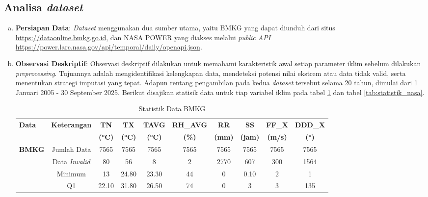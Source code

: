 \subsection{Analisa \textit{dataset}}
    \begin{enumerate}[(a)]
        \item \textbf{Persiapan Data}: \textit{Dataset} menggunakan dua sumber utama, yaitu BMKG yang dapat diunduh dari situs \url{https://dataonline.bmkg.go.id}, dan NASA POWER yang diakses melalui \textit{public API} \url{https://power.larc.nasa.gov/api/temporal/daily/openapi.json}.
        \item \textbf{Observasi Deskriptif}: Observasi deskriptif dilakukan untuk memahami karakteristik awal setiap parameter iklim sebelum dilakukan \textit{preprocessing}. Tujuannya adalah mengidentifikasi kelengkapan data, mendeteksi potensi nilai ekstrem atau data tidak valid, serta menentukan strategi imputasi yang tepat. Adapun rentang pengambilan pada kedua \textit{dataset} tersebut selama 20 tahun, dimulai dari 1 Januari 2005 - 30 September 2025. Berikut disajikan statisik data untuk tiap variabel iklim pada tabel \ref{tab:statistik_bmkg} dan tabel \ref{tab:statistik_nasa}.
        \begin{table}[H] 
            \centering
            \caption{Statistik Data BMKG}
            \label{tab:statistik_bmkg}
            \begin{adjustbox}{max width=\textwidth}
            \small
            \begin{tabular}{|l|c|c|c|c|c|c|c|c|c|}
            \hline
            \textbf{Data} & \textbf{Keterangan} & \textbf{TN} & \textbf{TX} & \textbf{TAVG} & \textbf{RH\_AVG} & \textbf{RR} & \textbf{SS} & \textbf{FF\_X} & \textbf{DDD\_X} \\
            & & \textbf{(°C)} & \textbf{(°C)} & \textbf{(°C)} & \textbf{(\%)} & \textbf{(mm)} & \textbf{(jam)} & \textbf{(m/s)} & \textbf{(°)} \\
            \hline\hline
            \multirow{9}{*}{\textbf{BMKG}} 
            & Jumlah Data & 7565 & 7565 & 7565 & 7565 & 7565 & 7565 & 7565 & 7565 \\
            \cline{2-10}
            & Data \textit{Invalid} & 80 & 56 & 8 & 2 & 2770 & 607 & 300 & 1564 \\
            \cline{2-10}
            & Minimum & 13 & 24.80 & 23.30 & 44 & 0 & 0.10 & 2 & 1 \\
            \cline{2-10}
            & Q1 & 22.10 & 31.80 & 26.50 & 74 & 0 & 3 & 3 & 135 \\

\end{tabular}
\end{adjustbox}
\end{table}
\end{enumerate}
